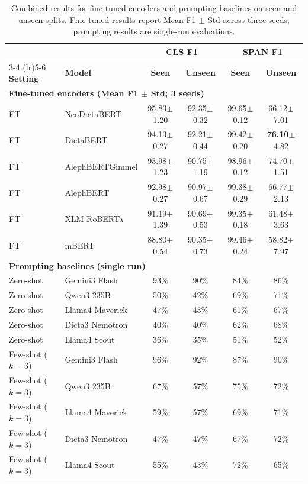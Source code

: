 \documentclass[11pt]{article}
\begin{document}
\begin{table}[t]
\centering
\scriptsize
\setlength{\tabcolsep}{4pt}
\renewcommand{\arraystretch}{1.0}
\begin{tabularx}{\linewidth}{@{}l X c c c c@{}}
\toprule
 &  & \multicolumn{2}{c}{\textbf{CLS F1}} & \multicolumn{2}{c}{\textbf{SPAN F1}} \\
\cmidrule(lr){3-4} \cmidrule(lr){5-6}
\textbf{Setting} & \textbf{Model} & \textbf{Seen} & \textbf{Unseen} & \textbf{Seen} & \textbf{Unseen} \\
\midrule
\multicolumn{6}{l}{\textbf{Fine-tuned encoders (Mean F1 $\pm$ Std; 3 seeds)}} \\
FT & NeoDictaBERT & 95.83{\tiny$\pm$1.20} & 92.35{\tiny$\pm$0.32} & 99.65{\tiny$\pm$0.12} & 66.12{\tiny$\pm$7.01} \\
FT & DictaBERT & 94.13{\tiny$\pm$0.27} & 92.21{\tiny$\pm$0.44} & 99.42{\tiny$\pm$0.20} & \textbf{76.10}{\tiny$\pm$4.82} \\
FT & AlephBERTGimmel & 93.98{\tiny$\pm$1.23} & 90.75{\tiny$\pm$1.19} & 98.96{\tiny$\pm$0.12} & 74.70{\tiny$\pm$1.51} \\
FT & AlephBERT & 92.98{\tiny$\pm$0.27} & 90.97{\tiny$\pm$0.67} & 99.38{\tiny$\pm$0.29} & 66.77{\tiny$\pm$2.13} \\
FT & XLM-RoBERTa & 91.19{\tiny$\pm$1.39} & 90.69{\tiny$\pm$0.53} & 99.35{\tiny$\pm$0.18} & 61.48{\tiny$\pm$3.63} \\
FT & mBERT & 88.80{\tiny$\pm$0.54} & 90.35{\tiny$\pm$0.73} & 99.46{\tiny$\pm$0.24} & 58.82{\tiny$\pm$7.97} \\
\midrule
\multicolumn{6}{l}{\textbf{Prompting baselines (single run)}} \\
Zero-shot & Gemini3 Flash & 93\% & 90\% & 84\% & 86\% \\
Zero-shot & Qwen3 235B & 50\% & 42\% & 69\% & 71\% \\
Zero-shot & Llama4 Maverick & 47\% & 43\% & 61\% & 67\% \\
Zero-shot & Dicta3 Nemotron & 40\% & 40\% & 62\% & 68\% \\
Zero-shot & Llama4 Scout & 36\% & 35\% & 51\% & 52\% \\
Few-shot ($k{=}3$) & Gemini3 Flash & 96\% & 92\% & 87\% & 90\% \\
Few-shot ($k{=}3$) & Qwen3 235B & 67\% & 57\% & 75\% & 72\% \\
Few-shot ($k{=}3$) & Llama4 Maverick & 59\% & 57\% & 69\% & 71\% \\
Few-shot ($k{=}3$) & Dicta3 Nemotron & 47\% & 47\% & 67\% & 72\% \\
Few-shot ($k{=}3$) & Llama4 Scout & 55\% & 43\% & 72\% & 65\% \\
\bottomrule
\end{tabularx}
\caption{Combined results for fine-tuned encoders and prompting baselines on seen and unseen splits. Fine-tuned results report Mean F1 $\pm$ Std across three seeds; prompting results are single-run evaluations.}
\label{tab:combined_results}
\end{table}
\end{document}
